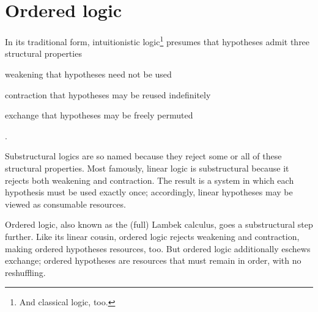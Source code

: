 \chapter{Ordered logic}\label{ch:ordered-logic}




In its traditional form, intuitionistic logic\footnote{And classical logic, too.} presumes that hypotheses admit three structural properties
\begin{description*}[
  mode=unboxed,
  before=\unskip:\space,
  font=\normalfont\itshape, afterlabel={,\space},
  itemjoin=;\space, itemjoin*=; and\space%
]
\item[weakening] that hypotheses need not be used
\item[contraction] that hypotheses may be reused indefinitely
\item[exchange] that hypotheses may be freely permuted
\end{description*}.

Substructural logics are so named because they reject some or all of these structural properties.
Most famously, linear logic\autocite{Girard:TCS87} is substructural because it rejects both weakening and contraction.
The result is a system in which each hypothesis must be used exactly once; accordingly, linear hypotheses may be viewed as consumable resources\autocite{Girard:TCS87}.

Ordered logic, also known as the (full) Lambek calculus,\autocites{Lambek:AMM58}{Lambek:SLIM61}{Abrusci:MLQ90}{Kanazawa:LLI92} goes a substructural step further.
Like its linear cousin, ordered logic rejects weakening and contraction, making ordered hypotheses resources, too.
But ordered logic additionally eschews exchange; 
ordered hypotheses are resources that must remain in order, with no reshuffling.


